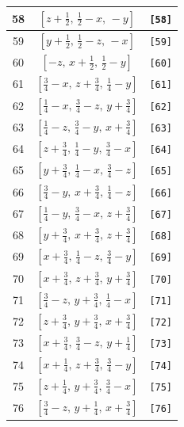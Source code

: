 \documentclass[fleqn,8pt]{jsarticle}
\begin{document}
\begin{longtable}{ccc}
58 & $\left[ z + \frac{1}{2},\, \frac{1}{2} - x,\, - y \right]$ & {\tt [58]} \\ \hline
59 & $\left[ y + \frac{1}{2},\, \frac{1}{2} - z,\, - x \right]$ & {\tt [59]} \\ \hline
60 & $\left[ - z,\, x + \frac{1}{2},\, \frac{1}{2} - y \right]$ & {\tt [60]} \\ \hline
61 & $\left[ \frac{3}{4} - x,\, z + \frac{3}{4},\, \frac{1}{4} - y \right]$ & {\tt [61]} \\ \hline
62 & $\left[ \frac{1}{4} - x,\, \frac{3}{4} - z,\, y + \frac{3}{4} \right]$ & {\tt [62]} \\ \hline
63 & $\left[ \frac{1}{4} - z,\, \frac{3}{4} - y,\, x + \frac{3}{4} \right]$ & {\tt [63]} \\ \hline
64 & $\left[ z + \frac{3}{4},\, \frac{1}{4} - y,\, \frac{3}{4} - x \right]$ & {\tt [64]} \\ \hline
65 & $\left[ y + \frac{3}{4},\, \frac{1}{4} - x,\, \frac{3}{4} - z \right]$ & {\tt [65]} \\ \hline
66 & $\left[ \frac{3}{4} - y,\, x + \frac{3}{4},\, \frac{1}{4} - z \right]$ & {\tt [66]} \\ \hline
67 & $\left[ \frac{1}{4} - y,\, \frac{3}{4} - x,\, z + \frac{3}{4} \right]$ & {\tt [67]} \\ \hline
68 & $\left[ y + \frac{3}{4},\, x + \frac{3}{4},\, z + \frac{3}{4} \right]$ & {\tt [68]} \\ \hline
69 & $\left[ x + \frac{3}{4},\, \frac{1}{4} - z,\, \frac{3}{4} - y \right]$ & {\tt [69]} \\ \hline
70 & $\left[ x + \frac{3}{4},\, z + \frac{3}{4},\, y + \frac{3}{4} \right]$ & {\tt [70]} \\ \hline
71 & $\left[ \frac{3}{4} - z,\, y + \frac{3}{4},\, \frac{1}{4} - x \right]$ & {\tt [71]} \\ \hline
72 & $\left[ z + \frac{3}{4},\, y + \frac{3}{4},\, x + \frac{3}{4} \right]$ & {\tt [72]} \\ \hline
73 & $\left[ x + \frac{3}{4},\, \frac{3}{4} - z,\, y + \frac{1}{4} \right]$ & {\tt [73]} \\ \hline
74 & $\left[ x + \frac{1}{4},\, z + \frac{3}{4},\, \frac{3}{4} - y \right]$ & {\tt [74]} \\ \hline
75 & $\left[ z + \frac{1}{4},\, y + \frac{3}{4},\, \frac{3}{4} - x \right]$ & {\tt [75]} \\ \hline
76 & $\left[ \frac{3}{4} - z,\, y + \frac{1}{4},\, x + \frac{3}{4} \right]$ & {\tt [76]} \\ \hline

\end{longtable}
\end{document}
